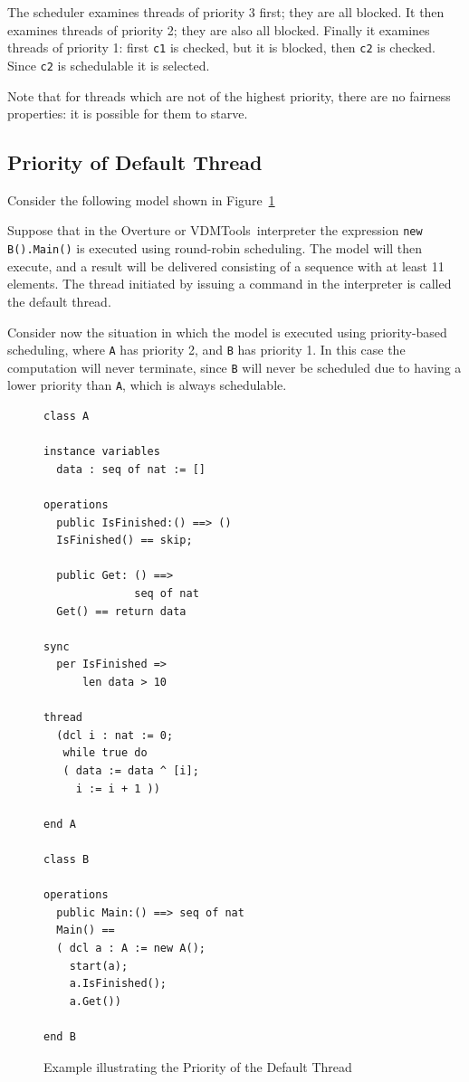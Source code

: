 \documentclass{overturerepchap}
\newcommand{\vdmtools}{VDMTools}
\begin{document}
The scheduler examines threads of priority 3 first; they are all
blocked. It then examines threads of priority 2; they are also all
blocked. Finally it examines threads of priority 1: first \texttt{c1}
is checked, but it is blocked, then \texttt{c2} is checked. Since \texttt{c2}
is schedulable it is selected.

Note that for threads which are not of the highest priority, there are no fairness properties: it is possible for them to starve.

\subsection{Priority of Default Thread}

Consider the following model shown in Figure~\ref{fig:priodefault}

Suppose that in the Overture or \vdmtools\ interpreter
the expression \texttt{new B().Main()} is executed
using round-robin scheduling. The model will then execute, and a
result will be delivered consisting of a sequence with at least 11
elements. The thread initiated by issuing a command in the interpreter is
called the default thread.

Consider now the situation in which the model is executed using
priority-based scheduling, where \texttt{A} has priority 2, and
\texttt{B} has priority 1. In this case the computation will never
terminate, since \texttt{B} will never be scheduled due to having a
lower priority than \texttt{A}, which is always schedulable.

\begin{figure}
\begin{lstlisting}
class A

instance variables
  data : seq of nat := []

operations
  public IsFinished:() ==> ()
  IsFinished() == skip;

  public Get: () ==>
              seq of nat
  Get() == return data

sync
  per IsFinished =>
      len data > 10

thread
  (dcl i : nat := 0;
   while true do
   ( data := data ^ [i];
     i := i + 1 ))

end A

class B

operations
  public Main:() ==> seq of nat
  Main() ==
  ( dcl a : A := new A();
    start(a);
    a.IsFinished();
    a.Get())

end B
\end{lstlisting}
\caption{Example illustrating the Priority of the Default Thread\label{fig:priodefault}}
\end{figure}
\end{document}
